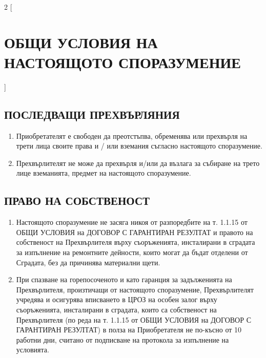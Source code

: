 \begin{multicols}{2} [\section{ОБЩИ УСЛОВИЯ НА НАСТОЯЩОТО
    СПОРАЗУМЕНИЕ}]
  \subsection{ПОСЛЕДВАЩИ ПРЕХВЪРЛЯНИЯ}
  \begin{enumerate}
  \item Приобретателят е свободен да преотстъпва, обременява или
    прехвърля на трети лица своите права и / или вземания съгласно
    настоящото споразумение.
  \item Прехвърлителят не може да прехвърля и/или да възлага за
    събиране на трето лице вземанията, предмет на настоящото
    споразумение.
  \end{enumerate}

  \subsection{ПРАВО НА СОБСТВЕНОСТ}
  \begin{enumerate}
  \item Настоящото споразумение не засяга никоя от разпоредбите на
    т. 1.1.15 от ОБЩИ УСЛОВИЯ на ДОГОВОР С ГАРАНТИРАН РЕЗУЛТАТ и
    правото на собственост на Прехвърлителя върху съоръженията,
    инсталирани в сградата за изпълнение на ремонтните дейности, които
    могат да бъдат отделени от Сградата, без да причинява материални
    щети.
  \item При спазване на горепосоченото и като гаранция за задълженията
    на Прехвърлителя, произтичащи от настоящото споразумение,
    Прехвърлителят учредява и осигурява вписването в ЦРОЗ на особен
    залог върху съоръженията, инсталирани в сградата, които са
    собственост на Прехвърлителя (по реда на т. 1.1.15 от ОБЩИ УСЛОВИЯ
    на ДОГОВОР С ГАРАНТИРАН РЕЗУЛТАТ) в полза на Приобретателя не
    по-късно от 10 работни дни, считано от подписване на протокола за
    изпълнение на условията.
  \end{enumerate}


\end{multicols}
